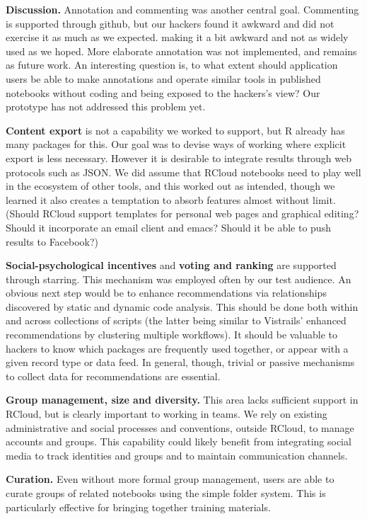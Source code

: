 {\bf Discussion.} Annotation and commenting was another central goal.
Commenting is supported through github, but our hackers found it
awkward and did not exercise it as much as we expected.
making it a bit awkward and
not as widely used as we hoped.  More elaborate annotation was not
implemented, and remains as future work.
An interesting question is, to what extent should application users
be able to make annotations and operate similar tools in published
notebooks without coding and being exposed to the hackers's view?
Our prototype has not addressed this problem yet.

{\bf Content export} is not a capability we worked to support,
but R already has many packages for this. Our goal was to devise
ways of working where explicit export is less necessary.
However it is desirable to integrate results
through web protocols such as JSON. We did assume that RCloud
notebooks need to play well in the ecosystem of other tools,
and this worked out as intended, though we learned it also creates
a temptation to absorb features almost without limit. (Should
RCloud support templates for personal web pages and graphical
editing? Should it incorporate an email client and emacs?
Should it be able to push results to Facebook?)

{\bf Social-psychological incentives} and {\bf voting and ranking}
are supported through starring. This mechanism was employed often
by our test audience. An obvious next step would be to enhance
recommendations via relationships discovered by static and
dynamic code analysis. This should be done both within and across
collections of scripts (the latter being similar to Vistrails'
enhanced recommendations by clustering multiple workflows).
It should be valuable to hackers to know which packages are
frequently used together, or appear with a given record type
or data feed. In general, though, trivial or passive mechanisms
to collect data for recommendations are essential.

{\bf Group management, size and diversity.} This area lacks sufficient
support in RCloud, but is clearly important to working in teams.
We rely on existing administrative and social processes and conventions,
outside RCloud, to manage accounts and groups. This capability
could likely benefit from integrating social media to track
identities and groups and to maintain communication channels.

{\bf Curation.} Even without more formal group management, users are
able to curate groups of related notebooks using the simple folder
system.  This is particularly effective for bringing together
training materials.

